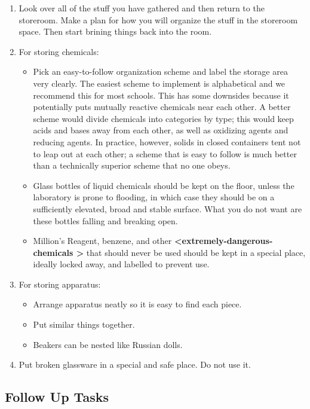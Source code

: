 \documentclass{report}
\begin{document}
\begin{enumerate}
{\begin{itemize}
\end{itemize}
}
\item{Look over all of the stuff you have gathered and then return to the storeroom. Make a plan for how you will organize the stuff in the storeroom space. Then start brining things back into the room.}
\item{For storing chemicals:
\begin{itemize}
\item{Pick an easy-to-follow organization scheme and label the storage area very clearly. The easiest scheme to implement is alphabetical and we recommend this for most schools. This has some downsides because it potentially puts mutually reactive chemicals near each other. A better scheme would divide chemicals into categories by type; this would keep acids and bases away from each other, as well as oxidizing agents and reducing agents. In practice, however, solids in closed containers tent not to leap out at each other; a scheme that is easy to follow is much better than a technically superior scheme that no one obeys.}
\item{Glass bottles of liquid chemicals should be kept on the floor, unless the laboratory is prone to flooding, in which case they should be on a sufficiently elevated, broad and stable surface. What you do not want are these bottles falling and breaking open.}
\item{Million's Reagent, benzene, and other \textbf{\textless extremely-dangerous-chemicals \textgreater} that should never be used should be kept in a special place, ideally locked away, and labelled to prevent use.}

\end{itemize}
}
\item{For storing apparatus: 
\begin{itemize}
\item{Arrange apparatus neatly so it is easy to find each piece.}
\item{Put similar things together.}
\item{Beakers can be nested like Russian dolls.}
\end{itemize}
}
\item{Put broken glassware in a special and safe place. Do not use it.}
\end{enumerate}

\subsection{Follow Up Tasks}
\end{document}
